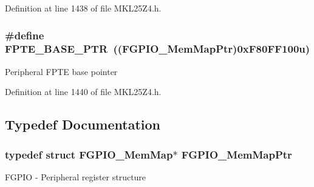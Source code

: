 Definition at line 1438 of file M\+K\+L25\+Z4.\+h.

\subsubsection[{\texorpdfstring{F\+P\+T\+E\+\_\+\+B\+A\+S\+E\+\_\+\+P\+TR}{FPTE_BASE_PTR}}]{\setlength{\rightskip}{0pt plus 5cm}\#define F\+P\+T\+E\+\_\+\+B\+A\+S\+E\+\_\+\+P\+TR~(({\bf F\+G\+P\+I\+O\+\_\+\+Mem\+Map\+Ptr})0x\+F80\+F\+F100u)}\hypertarget{group___f_g_p_i_o___peripheral_ga191ce600c147c06111ecea5b3b0aa6fb}{}\label{group___f_g_p_i_o___peripheral_ga191ce600c147c06111ecea5b3b0aa6fb}
Peripheral F\+P\+TE base pointer 

Definition at line 1440 of file M\+K\+L25\+Z4.\+h.



\subsection{Typedef Documentation}
\subsubsection[{\texorpdfstring{F\+G\+P\+I\+O\+\_\+\+Mem\+Map\+Ptr}{FGPIO_MemMapPtr}}]{\setlength{\rightskip}{0pt plus 5cm}typedef struct {\bf F\+G\+P\+I\+O\+\_\+\+Mem\+Map}$\ast$ {\bf F\+G\+P\+I\+O\+\_\+\+Mem\+Map\+Ptr}}\hypertarget{group___f_g_p_i_o___peripheral_gaeed3beeb5e5c99ae5b0e404b21466e55}{}\label{group___f_g_p_i_o___peripheral_gaeed3beeb5e5c99ae5b0e404b21466e55}
F\+G\+P\+IO -\/ Peripheral register structure 
